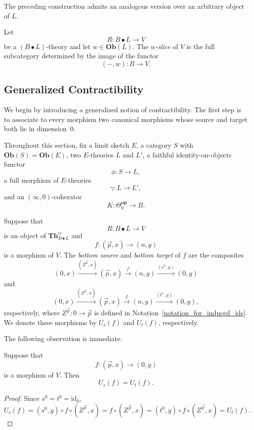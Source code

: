 \documentclass{tac}
\begin{document}
The preceding construction admits an analogous version over an arbitrary object of $L$.

\begin{definition}
Let
\[
R:B\bullet L\to V
\]
be a $(B\bullet L)$-theory and let $w\in\mathbf{Ob}(L)$. The \emph{$w$-slice} of $V$ is the full subcategory determined by the image of the functor
\[
(-,w):B\longrightarrow V.
\]
\end{definition}
\subsection*{Generalized Contractibility}
We begin by introducing a generalized notion of contractibility. The first step is to associate to every morphism two canonical morphisms whose source and target both lie in dimension~$0$.

Throughout this section, fix a limit sketch $E$, a category $S$ with
$\mathbf{Ob}(S)=\mathbf{Ob}(E)$, two $E$-theories $L$ and $L'$, a faithful identity-on-objects functor
\[
\phi:S\to L,
\]
a full morphism of $E$-theories
\[
\gamma:L\to L',
\]
and an $(\infty,0)$-coherator
\[
K:\Theta_0^\mathbf{op}\to B.
\]

\begin{definition}\label{gen_admissibility_cond}
Suppose that
\[
R:B\bullet L\to V
\]
is an object of $\mathbf{Th}_{B\bullet L}^{\cong}$ and
\[
f:(\vec{p},x)\to(n,y)
\]
is a morphism of $V$. The \emph{bottom source} and \emph{bottom target} of $f$ are the composites
\[
(0,x)\xrightarrow{(Z^{\vec{p}},x)}
(\vec{p},x)
\xrightarrow{f}
(n,y)
\xrightarrow{(s^n,y)}
(0,y)
\]
and
\[
(0,x)\xrightarrow{(Z^{\vec{p}},x)}
(\vec{p},x)
\xrightarrow{f}
(n,y)
\xrightarrow{(t^n,y)}
(0,y),
\]
respectively, where $Z^{\vec p}:0\to\vec p$ is defined in Notation~\ref{notation_for_induced_ids}. We denote these morphisms by $U_s(f)$ and $U_t(f)$, respectively.
\end{definition}

The following observation is immediate.

\begin{lemma}
Suppose that
\[
f:(\vec p,x)\to(0,y)
\]
is a morphism of $V$. Then
\[
U_s(f)=U_t(f).
\]
\end{lemma}

\begin{proof}
Since $s^0=t^0=\mathrm{id}_0$,
\[
U_s(f)
=(s^0,y)\circ f\circ(Z^{\vec p},x)
=f\circ(Z^{\vec p},x)
=(t^0,y)\circ f\circ(Z^{\vec p},x)
=U_t(f).
\]
\end{proof}
\end{document}
